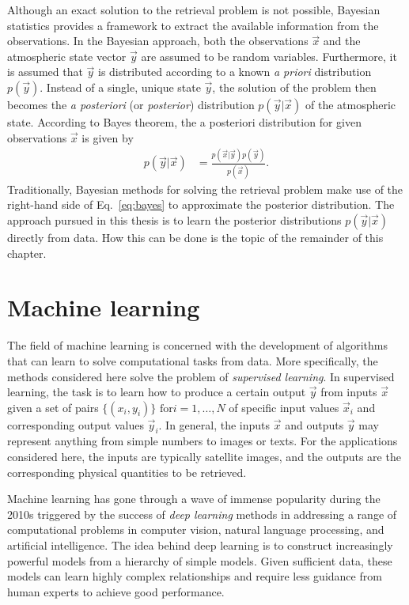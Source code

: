 Although an exact solution to the retrieval problem is not possible, Bayesian
statistics provides a framework to extract the available information from the
observations. In the Bayesian approach, both the observations $\vec{x}$ and the
atmospheric state vector $\vec{y}$ are assumed to be random variables.
Furthermore,  it is assumed that $\vec{y}$ is distributed according to a known
\textit{a priori} distribution $p(\vec{y})$. Instead of a single, unique state
$\vec{y}$, the solution of the problem then becomes the \textit{a posteriori} (or
\textit{posterior}) distribution $p(\vec{y} | \vec{x})$ of the atmospheric
state. According to Bayes theorem, the a posteriori distribution for given
observations $\vec{x}$ is given by
\begin{align}\label{eq:bayes}
  p(\vec{y} | \vec{x}) &= \frac{p(\vec{x}|\vec{y})
  p(\vec{y})}{p(\vec{x})}.
\end{align}
Traditionally, Bayesian methods for solving the retrieval problem make use of
the right-hand side of Eq.~\ref{eq:bayes} to approximate the posterior
distribution. The approach pursued in this thesis is to learn the posterior
distributions $p(\vec{y}|\vec{x})$ directly from data. How this can be done is
the topic of the remainder of this chapter.

\section{Machine learning}


The field of machine learning is concerned with the development of algorithms
that can learn to solve computational tasks from data. More specifically, the
methods considered here solve the problem of \textit{supervised learning}. In
supervised learning, the task is to learn how to produce a certain output
$\vec{y}$ from inputs $\vec{x}$ given a set of pairs $\{(x_i, y_i)\}\text{ for
}i = 1, \ldots, N$ of specific input values $\vec{x}_i$ and corresponding output
values $\vec{y}_i$. In general, the inputs $\vec{x}$ and outputs $\vec{y}$ may
represent anything from simple numbers to images or texts. For the applications
considered here, the inputs are typically satellite images, and the outputs are
the corresponding physical quantities to be retrieved.

Machine learning has gone through a wave of immense popularity during the 2010s
triggered by the success of \textit{deep learning} methods in addressing a range
of computational problems in computer vision, natural language processing, and
artificial intelligence. The idea behind deep learning is to construct
increasingly powerful models from a hierarchy of simple models. Given sufficient
data, these models can learn highly complex relationships and require less
guidance from human experts to achieve good performance.


